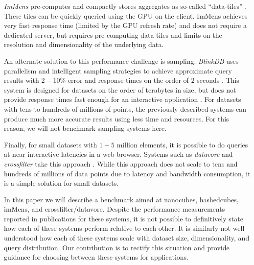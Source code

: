 \documentclass[journal]{vgtc}                %
\begin{document}
\textit{ImMens} pre-computes and compactly stores aggregates as so-called
``data-tiles'' \cite{2013-immens}. These tiles can be quickly queried using the
GPU on the client.  ImMens achieves very fast response time (limited by the GPU
refresh rate) and does not require a dedicated server, but requires
pre-computing data tiles and limits on the resolution and dimensionality of the
underlying data.

An alternate solution to this performance challenge is sampling.
\textit{BlinkDB} uses parallelism and intelligent sampling strategies to
achieve approximate query results with $2-10\%$ error and response times on the
order of $2$ seconds \cite{blinkdb}. This system is designed for datasets on
the order of terabytes in size, but does not provide response times fast enough
for an interactive application . For datasets with tens to hundreds of millions of
points, the previously described systems can produce much more accurate results
using less time and resources. For this reason, we will not benchmark sampling
systems here. 

Finally, for small datasets with $1-5$ million elements, it is possible to do
queries at near interactive latencies in a web browser. Systems such as
\textit{datavore} and \textit{crossfilter} take this approach
\cite{crossfilter,datavore}. While this approach does not scale to tens and
hundreds of millions of data points due to latency and bandwidth consumption,
it is a simple solution for small datasets. 

In this paper we will describe a benchmark aimed at nanocubes, hashedcubes,
imMens, and crossfilter/datavore. Despite the performance measurements reported
in publications for these systems, it is not possible to definitively state how
each of these systems perform relative to each other. It is similarly not
well-understood how each of these systems scale with dataset size,
dimensionality, and query distribution. Our contribution is to rectify this
situation and provide guidance for choosing between these systems for
applications.



\end{document}
